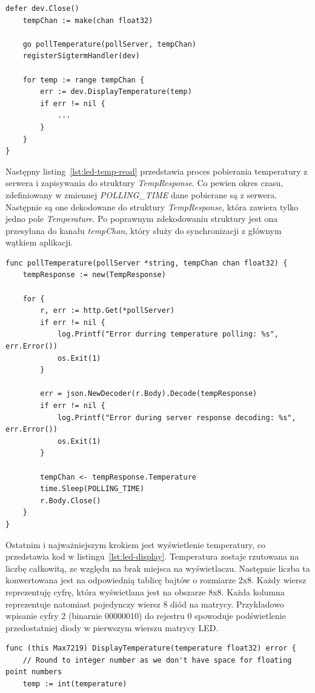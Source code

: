 \documentclass[12pt]{report}
\begin{document}
{\begin{lstlisting}[language=golang,caption=Konfiguracja aplikacji,label=lst:led-config]
	defer dev.Close()
	tempChan := make(chan float32)
	
	go pollTemperature(pollServer, tempChan)
	registerSigtermHandler(dev)
	
	for temp := range tempChan {
		err := dev.DisplayTemperature(temp)
		if err != nil {
			...
		}
	}
}
\end{lstlisting}

\newpage
\noindent Następny listing~\ref{lst:led-temp-read} przedstawia proces pobierania temperatury z serwera i zapisywania do struktury \textit{TempResponse}. Co pewien okres czasu, zdefiniowany w zmiennej \textit{POLLING\_TIME} dane pobierane są z serwera. Następnie są one dekodowane do struktury \textit{TempResponse}, która zawiera tylko jedno pole \textit{Temperature}. Po poprawnym zdekodowaniu struktury jest ona przesyłana do kanału \textit{tempChan}, który służy do synchronizacji z głównym wątkiem aplikacji.
\begin{lstlisting}[language=golang,caption=Odczyt temperatury z serwera,label=lst:led-temp-read]
func pollTemperature(pollServer *string, tempChan chan float32) {
	tempResponse := new(TempResponse)

	for {
		r, err := http.Get(*pollServer)
		if err != nil {
			log.Printf("Error durring temperature polling: %s", err.Error())
			os.Exit(1)
		}

		err = json.NewDecoder(r.Body).Decode(tempResponse)
		if err != nil {
			log.Printf("Error during server response decoding: %s", err.Error())
			os.Exit(1)
		}

		tempChan <- tempResponse.Temperature
		time.Sleep(POLLING_TIME)
		r.Body.Close()
	}
}
\end{lstlisting}

\newpage
\noindent Ostatnim i najważniejszym krokiem jest wyświetlenie temperatury, co przedstawia kod w listingu~\ref{lst:led-display}. Temperatura zostaje rzutowana na liczbę całkowitą, ze względu na brak miejsca na wyświetlaczu. Następnie liczba ta konwertowana jest na odpowiednią tablicę bajtów o rozmiarze 2x8. Każdy wiersz reprezentuję cyfrę, która wyświetlana jest na obszarze 8x8. Każda kolumna reprezentuje natomiast pojedynczy wiersz 8 diód na matrycy. Przykładowo wpisanie cyfry 2 (binarnie 00000010) do rejestru 0 spowoduje podświetlenie przedostatniej diody w pierwszym wierszu matrycy LED.
\begin{lstlisting}[language=golang,caption=Wyświetlanie temperatury,label=lst:led-display]
func (this Max7219) DisplayTemperature(temperature float32) error {
	// Round to integer number as we don't have space for floating point numbers
	temp := int(temperature)


\end{lstlisting}}
\end{document}
